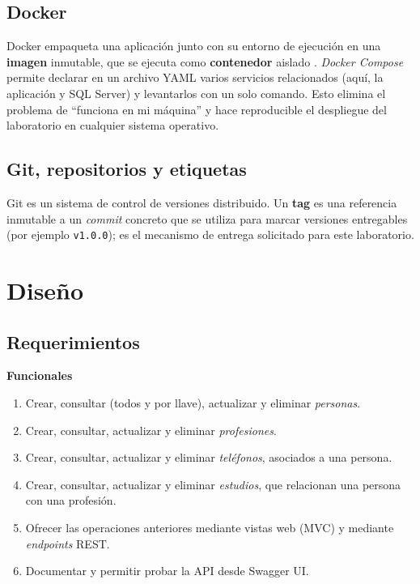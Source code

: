 \documentclass[12pt,letterpaper]{article}
\newcommand{\repoTag}{v1.0.0}
\begin{document}
\subsection{Docker}
Docker empaqueta una aplicación junto con su entorno de ejecución en una \textbf{imagen}
inmutable, que se ejecuta como \textbf{contenedor} aislado \cite{docker}. \emph{Docker
Compose} permite declarar en un archivo YAML varios servicios relacionados (aquí, la
aplicación y SQL Server) y levantarlos con un solo comando. Esto elimina el problema de
\enquote{funciona en mi máquina} y hace reproducible el despliegue del laboratorio en
cualquier sistema operativo.

\subsection{Git, repositorios y etiquetas}
Git es un sistema de control de versiones distribuido. Un \textbf{tag} es una referencia
inmutable a un \emph{commit} concreto que se utiliza para marcar versiones entregables
(por ejemplo \texttt{\repoTag}); es el mecanismo de entrega solicitado para este
laboratorio.

\section{Diseño}

\subsection{Requerimientos}

\textbf{Funcionales}
\begin{enumerate}[label=RF\arabic*., itemsep=2pt]
  \item Crear, consultar (todos y por llave), actualizar y eliminar \emph{personas}.
  \item Crear, consultar, actualizar y eliminar \emph{profesiones}.
  \item Crear, consultar, actualizar y eliminar \emph{teléfonos}, asociados a una persona.
  \item Crear, consultar, actualizar y eliminar \emph{estudios}, que relacionan una persona
        con una profesión.
  \item Ofrecer las operaciones anteriores mediante vistas web (MVC) y mediante
        \emph{endpoints} REST.
  \item Documentar y permitir probar la API desde Swagger UI.
\end{enumerate}
\end{document}
